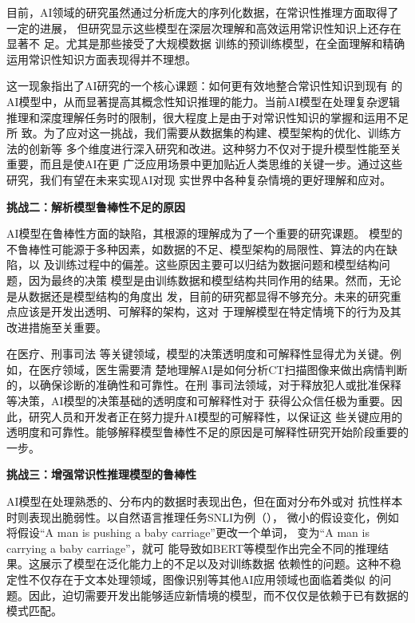 目前，AI领域的研究虽然通过分析庞大的序列化数据，在常识性推理方面取得了一定的进展，
但研究显示这些模型在深层次理解和高效运用常识性知识上还存在显著不
足\cite{lin2020birds,peng2022copen}。尤其是那些接受了大规模数据
训练的预训练模型，在全面理解和精确运用常识性知识方面表现得并不理想。

这一现象指出了AI研究的一个核心课题：如何更有效地整合常识性知识到现有
的AI模型中，从而显著提高其概念性知识推理的能力。当前AI模型在处理复杂逻辑
推理和深度理解任务时的限制，很大程度上是由于对常识性知识的掌握和运用不足所
致。为了应对这一挑战，我们需要从数据集的构建、模型架构的优化、训练方法的创新等
多个维度进行深入研究和改进。这种努力不仅对于提升模型性能至关重要，而且是使AI在更
广泛应用场景中更加贴近人类思维的关键一步。通过这些研究，我们有望在未来实现AI对现
实世界中各种复杂情境的更好理解和应对。

\textbf{挑战二：解析模型鲁棒性不足的原因}

AI模型在鲁棒性方面的缺陷，其根源的理解成为了一个重要的研究课题。
模型的不鲁棒性可能源于多种因素，如数据的不足、模型架构的局限性、算法的内在缺陷，以
及训练过程中的偏差。这些原因主要可以归结为数据问题和模型结构问题，因为最终的决策
模型是由训练数据和模型结构共同作用的结果。然而，无论是从数据还是模型结构的角度出
发，目前的研究都显得不够充分。未来的研究重点应该是开发出透明、可解释的架构，这对
于理解模型在特定情境下的行为及其改进措施至关重要。

在医疗、刑事司法
等关键领域，模型的决策透明度和可解释性显得尤为关键。例如，在医疗领域，医生需要清
楚地理解AI是如何分析CT扫描图像来做出病情判断的，以确保诊断的准确性和可靠性。在刑
事司法领域，对于释放犯人或批准保释等决策，AI模型的决策基础的透明度和可解释性对于
获得公众信任极为重要。因此，研究人员和开发者正在努力提升AI模型的可解释性，以保证这
些关键应用的透明度和可靠性。能够解释模型鲁棒性不足的原因是可解释性研究开始阶段重要的一步。

\textbf{挑战三：增强常识性推理模型的鲁棒性}

AI模型在处理熟悉的、分布内的数据时表现出色，但在面对分布外或对
抗性样本时则表现出脆弱性。以自然语言推理任务SNLI为例（），
微小的假设变化，例如
将假设``A man is pushing a baby carriage''更改一个单词，
变为``A man is carrying a baby carriage''，就可
能导致如BERT等模型作出完全不同的推理结果。这展示了模型在泛化能力上的不足以及对训练数据
依赖性的问题。这种不稳定性不仅存在于文本处理领域，图像识别等其他AI应用领域也面临着类似
的问题。因此，迫切需要开发出能够适应新情境的模型，而不仅仅是依赖于已有数据的模式匹配。


